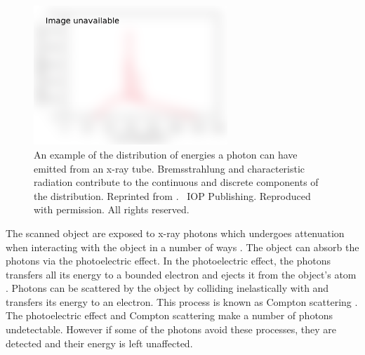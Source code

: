 \begin{figure}
  \centering
  \includegraphics[width=0.65\textwidth]{../figures/literatureReview/literature_spectrum.png}
  \caption{An example of the distribution of energies a photon can have emitted from an x-ray tube. Bremsstrahlung and characteristic radiation contribute to the continuous and discrete components of the distribution. Reprinted from \cite{michael2001x}. \textcopyright\ IOP Publishing. Reproduced with permission. All rights reserved.}
  \label{fig:literature_spectrum}
\end{figure}

The scanned object are exposed to x-ray photons which undergoes attenuation when interacting with the object in a number of ways \citep{cantatore2011introduction}. The object can absorb the photons via the photoelectric effect. In the photoelectric effect, the photons transfers all its energy to a bounded electron and ejects it from the object's atom \citep{millikan1916direct}. Photons can be scattered by the object by colliding inelastically with and transfers its energy to an electron. This process is known as Compton scattering \citep{compton1923quantum}. The photoelectric effect and Compton scattering make a number of photons undetectable. However if some of the photons avoid these processes, they are detected and their energy is left unaffected.

